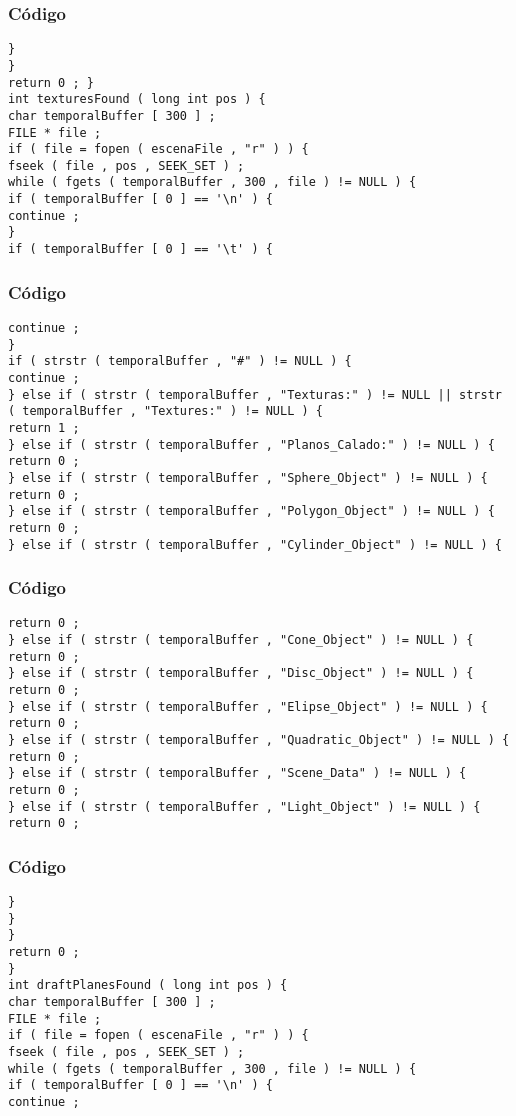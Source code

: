 \documentclass{beamer}
\begin{document}
\begin{frame}[fragile]
\frametitle{C\'odigo}
\begin{verbatim}
} 
} 
return 0 ; } 
int texturesFound ( long int pos ) { 
char temporalBuffer [ 300 ] ; 
FILE * file ; 
if ( file = fopen ( escenaFile , "r" ) ) { 
fseek ( file , pos , SEEK_SET ) ; 
while ( fgets ( temporalBuffer , 300 , file ) != NULL ) { 
if ( temporalBuffer [ 0 ] == '\n' ) { 
continue ; 
} 
if ( temporalBuffer [ 0 ] == '\t' ) { 
\end{verbatim}
\end{frame}
\begin{frame}[fragile]
\frametitle{C\'odigo}
\begin{verbatim}
continue ; 
} 
if ( strstr ( temporalBuffer , "#" ) != NULL ) { 
continue ; 
} else if ( strstr ( temporalBuffer , "Texturas:" ) != NULL || strstr ( temporalBuffer , "Textures:" ) != NULL ) { 
return 1 ; 
} else if ( strstr ( temporalBuffer , "Planos_Calado:" ) != NULL ) { 
return 0 ; 
} else if ( strstr ( temporalBuffer , "Sphere_Object" ) != NULL ) { 
return 0 ; 
} else if ( strstr ( temporalBuffer , "Polygon_Object" ) != NULL ) { 
return 0 ; 
} else if ( strstr ( temporalBuffer , "Cylinder_Object" ) != NULL ) { 
\end{verbatim}
\end{frame}
\begin{frame}[fragile]
\frametitle{C\'odigo}
\begin{verbatim}
return 0 ; 
} else if ( strstr ( temporalBuffer , "Cone_Object" ) != NULL ) { 
return 0 ; 
} else if ( strstr ( temporalBuffer , "Disc_Object" ) != NULL ) { 
return 0 ; 
} else if ( strstr ( temporalBuffer , "Elipse_Object" ) != NULL ) { 
return 0 ; 
} else if ( strstr ( temporalBuffer , "Quadratic_Object" ) != NULL ) { 
return 0 ; 
} else if ( strstr ( temporalBuffer , "Scene_Data" ) != NULL ) { 
return 0 ; 
} else if ( strstr ( temporalBuffer , "Light_Object" ) != NULL ) { 
return 0 ; 
\end{verbatim}
\end{frame}
\begin{frame}[fragile]
\frametitle{C\'odigo}
\begin{verbatim}
} 
} 
} 
return 0 ; 
} 
int draftPlanesFound ( long int pos ) { 
char temporalBuffer [ 300 ] ; 
FILE * file ; 
if ( file = fopen ( escenaFile , "r" ) ) { 
fseek ( file , pos , SEEK_SET ) ; 
while ( fgets ( temporalBuffer , 300 , file ) != NULL ) { 
if ( temporalBuffer [ 0 ] == '\n' ) { 
continue ; 
\end{verbatim}
\end{frame}
\end{document}
